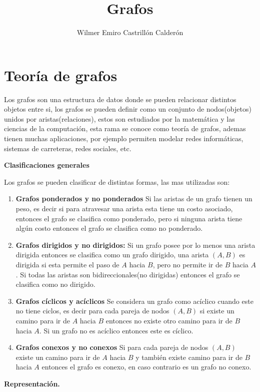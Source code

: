 \documentclass[12pt, a4paper]{article}
\title{\textbf{Grafos}}
\author{Wilmer Emiro Castrillón Calderón}
\newcommand{\subtitulo}[1]{\begin{center}\textbf{#1}\end{center}}
\begin{document}
	\maketitle
	
	\section{Teoría de grafos}
	Los grafos son una estructura de datos donde se pueden relacionar distintos objetos entre si, los grafos se pueden
	definir como un conjunto de nodos(objetos) unidos por aristas(relaciones), estos son estudiados por la
	matemática y las ciencias de la computación, esta rama se conoce como teoría de grafos, ademas tienen muchas 
	aplicaciones, por ejemplo permiten modelar redes informáticas, sistemas de carreteras, redes sociales, etc.
	
	\subtitulo{Clasificaciones generales}
	Los grafos se pueden clasificar de distintas formas, las mas utilizadas son:
	\begin{enumerate}[1.]
		\item \textbf{Grafos ponderados y no ponderados} Si las aristas de un grafo tienen un peso, es decir si para
			atravesar una arista esta tiene un costo asociado, entonces el grafo se clasifica como ponderado, pero si 
			ninguna arista tiene algún costo entonces el grafo se clasifica como no ponderado.
		\item \textbf{Grafos dirigidos y no dirigidos:} Si un grafo posee por lo menos una arista dirigida entonces
		 	se clasifica como un grafo dirigido, una arista $(A,B)$ es dirigida si esta permite el paso de $A$ hacia 
		 	$B$, pero no permite ir de $B$ hacia $A$. Si todas las aristas son bidireccionales(no dirigidas) entonces 
		 	el grafo se clasifica como no dirigido.
		\item \textbf{Grafos cíclicos y acíclicos} Se considera un grafo como acíclico cuando este no tiene ciclos, es
			decir para cada pareja de nodos $(A,B)$ si existe un camino para ir de $A$ hacia $B$ entonces no existe 
			otro camino para ir de $B$ hacia $A$. Si un grafo no es acíclico entonces este es cíclico.
		\item \textbf{Grafos conexos y no conexos} Si para cada pareja de nodos $(A,B)$ existe un camino para ir de 
			$A$ hacia $B$ y también existe camino para ir de $B$ hacia $A$ entonces el grafo es conexo, en caso 
			contrario es un grafo no conexo.
	\end{enumerate}
	
	\subtitulo{Representación.}
	
\end{document}
